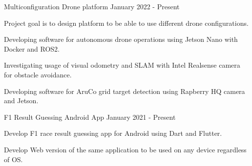 

\begin{cventries}

  \cventry
    {Multiconfiguration Drone platform}
    {}
    {} %
    {January 2022 - Present} %
    {
      \begin{cvitems} %
        \item {Project goal is to design platform to be able to use different drone configurations.}
        \item {Developing software for autonomous drone operations using Jetson Nano with Docker and ROS2.}
        \item {Investigating usage of visual odometry and SLAM with Intel Realsense camera for obstacle avoidance.}
        \item {Developing software for AruCo grid target detection using Rapberry HQ camera and Jetson.}
      \end{cvitems}
    }
  \cventry
    {F1 Result Guessing Android App}
    {}
    {} %
    {January 2021 - Present} %
    {
      \begin{cvitems} %
      \item {Develop F1 race result guessing app for Android using Dart and Flutter.}
      \item {Develop Web version of the same application to be used on any device regardless of OS.}
      \end{cvitems}
    }

\end{cventries}
